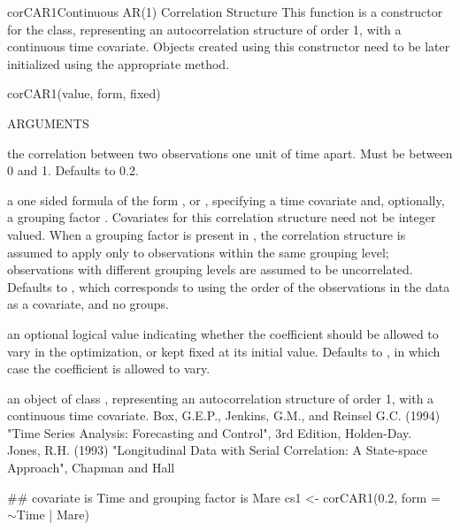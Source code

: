 \documentclass[pdftex]{article} \usepackage{url,graphicx}
\renewcommand{\Twiddle}{\mbox{\(\sim\)}}
\begin{document}
\begin{Helpfile}{corCAR1}{Continuous AR(1) Correlation Structure}
This function is a constructor for the  class,
representing an autocorrelation structure of order 1, with a
continuous time covariate. Objects created using this constructor need
to be later initialized using the appropriate 
method.
\begin{Example}
corCAR1(value, form, fixed)
\end{Example}
\begin{Argument}{ARGUMENTS}
\item[\Co{value:}]
the correlation between two observations one unit of time
apart. Must be between 0 and 1. Defaults to 0.2.
\item[\Co{form:}]
a one sided formula of the form \Co{\Twiddle t}, or \Co{\Twiddle t |
g}, specifying a time covariate  and,  optionally, a
grouping factor . Covariates for this correlation structure
need not be integer valued.  When a grouping factor is present in
, the correlation structure is assumed to apply only
to observations within the same grouping level; observations with
different grouping levels are assumed to be uncorrelated. Defaults to
\Co{\Twiddle 1}, which corresponds to using the order of the observations
in the data as a covariate, and no groups.
\item[\Co{fixed:}]
an optional logical value indicating whether the
coefficient should be allowed to vary in the optimization, or kept
fixed at its initial value. Defaults to , in which case
the coefficient is allowed to vary.
\end{Argument}
an object of class , representing an autocorrelation
structure of order 1, with a continuous time covariate.
Box, G.E.P., Jenkins, G.M., and Reinsel G.C. (1994) "Time Series
Analysis: Forecasting and Control", 3rd Edition, Holden-Day.\\

Jones, R.H. (1993) "Longitudinal Data with Serial Correlation: A
State-space Approach", Chapman and Hall

\need 15pt
\vspace{-16pt} 
\begin{Example}
## covariate is Time and grouping factor is Mare
cs1 <- corCAR1(0.2, form = \Twiddle Time | Mare)
\end{Example}
\end{Helpfile}
\end{document}
